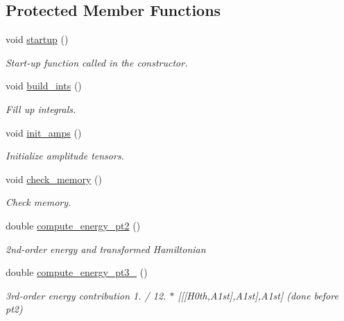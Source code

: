 \subsection*{Protected Member Functions}
\begin{DoxyCompactItemize}
\item 
void \mbox{\hyperlink{classforte_1_1_s_a___m_r_p_t3_a4ee1a4a2dd34fae25ef357fbbefc1638}{startup}} ()
\begin{DoxyCompactList}\small\item\em Start-\/up function called in the constructor. \end{DoxyCompactList}\item 
void \mbox{\hyperlink{classforte_1_1_s_a___m_r_p_t3_af0d9f9bd79cd81fe3cbcbce693dd894d}{build\+\_\+ints}} ()
\begin{DoxyCompactList}\small\item\em Fill up integrals. \end{DoxyCompactList}\item 
void \mbox{\hyperlink{classforte_1_1_s_a___m_r_p_t3_acd00d89503e8779bd6e723848610bf01}{init\+\_\+amps}} ()
\begin{DoxyCompactList}\small\item\em Initialize amplitude tensors. \end{DoxyCompactList}\item 
void \mbox{\hyperlink{classforte_1_1_s_a___m_r_p_t3_afb08422d7d2f6294e48e392f0bdbca58}{check\+\_\+memory}} ()
\begin{DoxyCompactList}\small\item\em Check memory. \end{DoxyCompactList}\item 
double \mbox{\hyperlink{classforte_1_1_s_a___m_r_p_t3_a485c6d4cc01e936df4ac3e5add94b114}{compute\+\_\+energy\+\_\+pt2}} ()
\begin{DoxyCompactList}\small\item\em 2nd-\/order energy and transformed Hamiltonian \end{DoxyCompactList}\item 
double \mbox{\hyperlink{classforte_1_1_s_a___m_r_p_t3_a8310e3c51a5ba44eeca27ef2cd3b8c82}{compute\+\_\+energy\+\_\+pt3\+\_}} ()
\begin{DoxyCompactList}\small\item\em 3rd-\/order energy contribution 1. / 12. $\ast$ \mbox{[}\mbox{[}\mbox{[}H0th,A1st\mbox{]},A1st\mbox{]},A1st\mbox{]} (done before pt2) \end{DoxyCompactList}\item 

\end{DoxyCompactItemize}
